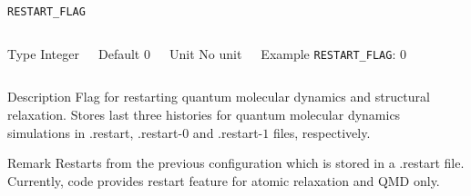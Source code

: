 \begin{frame}[allowframebreaks]{\texttt{RESTART\_FLAG}} \label{RESTART_FLAG}
\vspace*{-12pt}
\begin{columns}
\begin{block}{Type}
Integer
\end{block}

\begin{block}{Default}
0
\end{block}

\begin{block}{Unit}
No unit
\end{block}

\begin{block}{Example}
\texttt{RESTART\_FLAG}: 0
\end{block}
\end{columns}

\begin{block}{Description}
Flag for restarting quantum molecular dynamics and structural relaxation. Stores last three histories for quantum molecular dynamics simulations in .restart, .restart-$0$ and .restart-$1$ files, respectively.
\end{block}

\begin{block}{Remark}
Restarts from the previous configuration which is stored in a .restart file. Currently, code provides restart feature for atomic relaxation and QMD only. 
\end{block}

\end{frame}




